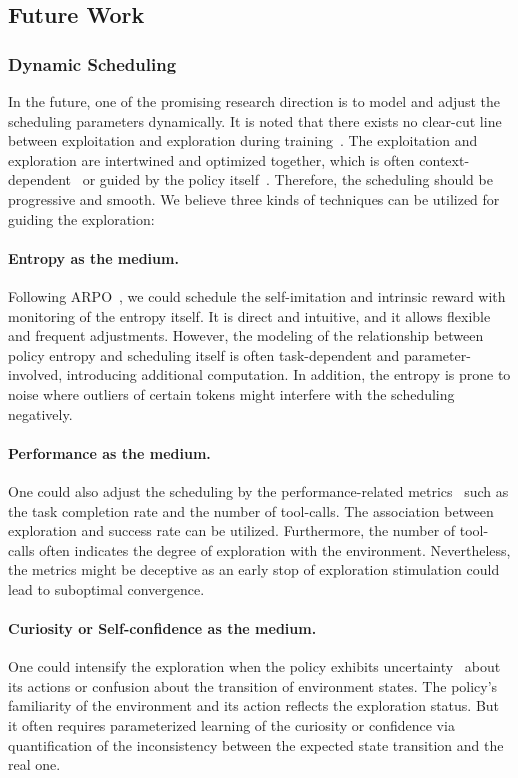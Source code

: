 \documentclass[]{youtu} %
\begin{document}
{

\subsection{Future Work}
\label{sec:future}
\subsubsection{Dynamic Scheduling}
In the future, one of the promising research direction is to model and adjust the scheduling parameters dynamically.
It is noted that there exists no clear-cut line between exploitation and exploration during training~\cite{snoek2012practical,wang2018exploration}.
The exploitation and exploration are intertwined and optimized together, which is often context-dependent~\cite{bellemare2016unifying} or guided by the policy itself~\cite{pathak2017curiosity}.
Therefore, the scheduling should be progressive and smooth.
We believe three kinds of techniques can be utilized for guiding the exploration:
\paragraph{Entropy as the medium.}
Following ARPO~\cite{dong2025agentic}, we could schedule the self-imitation and intrinsic reward with monitoring of the entropy itself. It is direct and intuitive, and it allows flexible and frequent adjustments. However, the modeling of the relationship between policy entropy and scheduling itself is often task-dependent and parameter-involved, introducing additional computation. In addition, the entropy is prone to noise where outliers of certain tokens might interfere with the scheduling negatively.
\paragraph{Performance as the medium.}
One could also adjust the scheduling by the performance-related metrics~\cite{agrawal2012analysis} such as the task completion rate and the number of tool-calls. The association between exploration and success rate can be utilized. Furthermore, the number of tool-calls often indicates the degree of exploration with the environment. Nevertheless, the metrics might be deceptive as an early stop of exploration stimulation could lead to suboptimal convergence.
\paragraph{Curiosity or Self-confidence as the medium.}
One could intensify the exploration when the policy exhibits uncertainty~\cite{pathak2017curiosity,ladosz2022exploration} about its actions or confusion about the transition of environment states.
The policy's familiarity of the environment and its action reflects the exploration status.
But it often requires parameterized learning of the curiosity or confidence via quantification of the inconsistency between the expected state transition and the real one.

}
\end{document}
